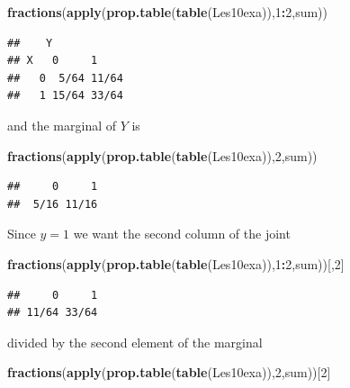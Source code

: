 \documentclass[]{book}
\newenvironment{Shaded}{\begin{snugshade}}{\end{snugshade}}
\newcommand{\KeywordTok}[1]{\textcolor[rgb]{0.13,0.29,0.53}{\textbf{#1}}}
\newcommand{\DecValTok}[1]{\textcolor[rgb]{0.00,0.00,0.81}{#1}}
\newcommand{\OperatorTok}[1]{\textcolor[rgb]{0.81,0.36,0.00}{\textbf{#1}}}
\newcommand{\NormalTok}[1]{#1}
\theoremstyle{definition}
\theoremstyle{definition}
\theoremstyle{definition}
\theoremstyle{remark}
\begin{document}
\begin{Shaded}
\begin{Highlighting}[]
\KeywordTok{fractions}\NormalTok{(}\KeywordTok{apply}\NormalTok{(}\KeywordTok{prop.table}\NormalTok{(}\KeywordTok{table}\NormalTok{(Les10exa)),}\DecValTok{1}\OperatorTok{:}\DecValTok{2}\NormalTok{,sum))}
\end{Highlighting}
\end{Shaded}

\begin{verbatim}
##    Y
## X   0     1    
##   0  5/64 11/64
##   1 15/64 33/64
\end{verbatim}

and the marginal of \(Y\) is

\begin{Shaded}
\begin{Highlighting}[]
\KeywordTok{fractions}\NormalTok{(}\KeywordTok{apply}\NormalTok{(}\KeywordTok{prop.table}\NormalTok{(}\KeywordTok{table}\NormalTok{(Les10exa)),}\DecValTok{2}\NormalTok{,sum))}
\end{Highlighting}
\end{Shaded}

\begin{verbatim}
##     0     1 
##  5/16 11/16
\end{verbatim}

Since \(y=1\) we want the second column of the joint

\begin{Shaded}
\begin{Highlighting}[]
\KeywordTok{fractions}\NormalTok{(}\KeywordTok{apply}\NormalTok{(}\KeywordTok{prop.table}\NormalTok{(}\KeywordTok{table}\NormalTok{(Les10exa)),}\DecValTok{1}\OperatorTok{:}\DecValTok{2}\NormalTok{,sum))[,}\DecValTok{2}\NormalTok{]}
\end{Highlighting}
\end{Shaded}

\begin{verbatim}
##     0     1 
## 11/64 33/64
\end{verbatim}

divided by the second element of the marginal

\begin{Shaded}
\begin{Highlighting}[]
\KeywordTok{fractions}\NormalTok{(}\KeywordTok{apply}\NormalTok{(}\KeywordTok{prop.table}\NormalTok{(}\KeywordTok{table}\NormalTok{(Les10exa)),}\DecValTok{2}\NormalTok{,sum))[}\DecValTok{2}\NormalTok{]}
\end{Highlighting}
\end{Shaded}
\end{document}
